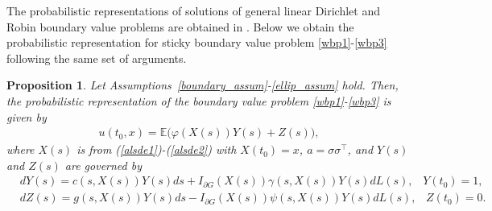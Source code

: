\documentclass{article}
\newtheorem{proposition}[theorem]{Proposition}
\theoremstyle{definition}
\numberwithin{equation}{section}
\begin{document}
The probabilistic representations of solutions of  general linear Dirichlet and Robin boundary value problems are obtained in \cite{freidlin_book}. Below we obtain the probabilistic representation for sticky boundary value problem \eqref{wbp1}-\eqref{wbp3} following the same set of arguments. 
\begin{proposition}
    Let Assumptions~\ref{boundary_assum}-\ref{ellip_assum} hold. Then, the probabilistic representation of the boundary value problem \eqref{wbp1}-\eqref{wbp3} is given by
    \begin{align}
       u(t_0, x) =  \mathbb{E}\big( \varphi(X(s)) Y(s) + Z(s)\big),
    \end{align}
  where  $X(s)$ is from (\ref{alsde1})-(\ref{alsde2}) with $X(t_0) = x$, $a = \sigma \sigma^{\top}$, and  $Y(s)$ and $Z(s)$ are governed by
\begin{align} 
    &dY(s) = c(s,X(s))Y(s)ds + I_{\partial G}(X(s))\gamma(s,X(s))Y(s)dL(s),\;\;\; Y(t_{0}) = 1,\label{alsde3}\\
    &dZ(s) = g(s,X(s))Y(s)ds  - I_{\partial G}(X(s))\psi(s,X(s))Y(s)dL(s),\;\;\; Z(t_{0}) = 0.\label{alsde4}
\end{align}
\end{proposition}
\end{document}
